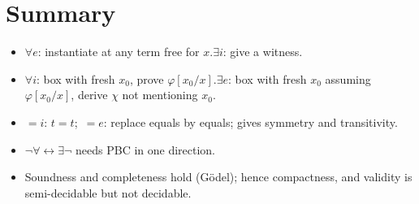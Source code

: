 \section*{Summary}
\begin{itemize}
  \item $\forall e$: instantiate at any term free for $x$.\quad $\exists i$: give a witness.
  \item $\forall i$: box with fresh $x_0$, prove $\varphi[x_0/x]$.\quad $\exists e$: box
        with fresh $x_0$ assuming $\varphi[x_0/x]$, derive $\chi$ not mentioning $x_0$.
  \item $=i$: $t=t$;\ $=e$: replace equals by equals; gives symmetry and transitivity.
  \item $\neg\forall\leftrightarrow\exists\neg$ needs PBC in one direction.
  \item Soundness and completeness hold (G\"odel); hence compactness, and validity is
        semi-decidable but not decidable.
\end{itemize}
